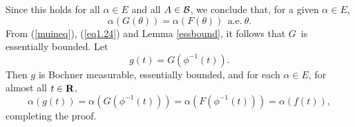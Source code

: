 Since this holds for all $\alpha\in E$ and all $A\in {\cal B}$, 
we conclude that, for a given $\alpha\in E$, 
\begin{equation}
\alpha(G(\theta))=\alpha(F(\theta))\ \ \mbox{a.e.}\ \theta .
\label{egtheta}
\end{equation}
From (\ref{muineq}), (\ref{eq1.24}) and Lemma \ref{essbound}, it follows
that $G$\ is essentially bounded.
Let
\begin{equation}
g(t)=G\left(\phi^{-1}(t)\right).
\label{defofg}
\end{equation}
Then $g$ is Bochner measurable, essentially bounded, and for each
$\alpha\in E$, 
for almost all $t\in \R$,
$$\alpha(g(t))=\alpha(G(\phi^{-1}(t)))=\alpha(F(\phi^{-1}(t)))
=\alpha(f(t)),$$
completing the proof.

\bigskip

